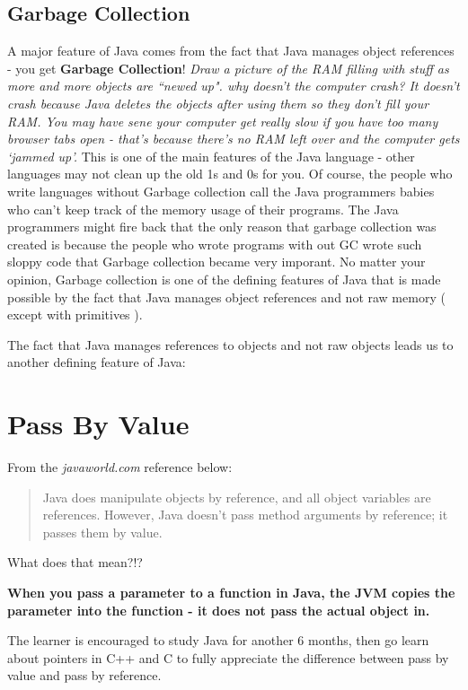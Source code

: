 \documentclass[12pt]{article}
\begin{document}
\subsection{Garbage Collection}
A major feature of Java comes from the fact that Java manages object references - you get \textbf{Garbage Collection}! \textit{Draw a picture of the RAM filling with stuff as more and more objects are ``newed up". why doesn't the computer crash? It doesn't crash because Java deletes the objects after using them so they don't fill your RAM. You may have sene your computer get really slow if you have too many browser tabs open - that's because there's no RAM left over and the computer gets `jammed up'.} This is one of the main features of the Java language - other languages  may not clean up the old 1s and 0s for you. Of course, the people who write languages without Garbage collection call the Java programmers babies who can't keep track of the memory usage of their programs. The Java programmers might fire back that the only reason that garbage collection was created is because the people who wrote programs with out GC wrote such sloppy code that Garbage collection became very imporant.
No matter your opinion, Garbage collection is one of the defining features of Java that is made possible by the fact that Java manages object references and not raw memory ( except with primitives ).

The fact that Java manages references to objects and not raw objects leads us to another defining feature of Java:

\section{Pass By Value}
From the \textit{javaworld.com} reference below:

\begin{quote}
Java does manipulate objects by reference, and all object variables are references. However, Java doesn't pass method arguments by reference; it passes them by value.
\end{quote}

What does that mean?!?

\begin{center}
\textbf{When you pass a parameter to a function in Java, the JVM copies the parameter into the function - it does not pass the actual object in.}
\end{center}

The learner is encouraged to study Java for another 6 months, then go learn about pointers in C++ and C to fully appreciate the difference between pass by value and pass by reference.
\end{document}
